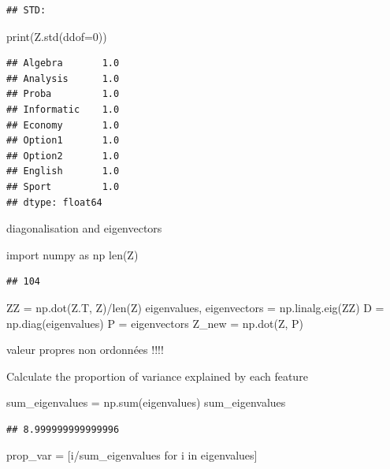 \documentclass[
  10pt,
]{article}
\newenvironment{Shaded}{\begin{snugshade}}{\end{snugshade}}
\newcommand{\NormalTok}[1]{#1}
\begin{document}
\begin{verbatim}
## STD:
\end{verbatim}

\begin{Shaded}
\begin{Highlighting}[]
\NormalTok{print(Z.std(ddof=0))}
\end{Highlighting}
\end{Shaded}

\begin{verbatim}
## Algebra       1.0
## Analysis      1.0
## Proba         1.0
## Informatic    1.0
## Economy       1.0
## Option1       1.0
## Option2       1.0
## English       1.0
## Sport         1.0
## dtype: float64
\end{verbatim}

diagonalisation and eigenvectors

\begin{Shaded}
\begin{Highlighting}[]
\NormalTok{import numpy as np}
\NormalTok{len(Z)}
\end{Highlighting}
\end{Shaded}

\begin{verbatim}
## 104
\end{verbatim}

\begin{Shaded}
\begin{Highlighting}[]
\NormalTok{ZZ = np.dot(Z.T, Z)/len(Z)}
\NormalTok{eigenvalues, eigenvectors = np.linalg.eig(ZZ)}
\NormalTok{D = np.diag(eigenvalues)}
\NormalTok{P = eigenvectors}
\NormalTok{Z\_new = np.dot(Z, P)}
\end{Highlighting}
\end{Shaded}

valeur propres non ordonnées !!!!

Calculate the proportion of variance explained by each feature

\begin{Shaded}
\begin{Highlighting}[]
\NormalTok{sum\_eigenvalues = np.sum(eigenvalues)}
\NormalTok{sum\_eigenvalues}
\end{Highlighting}
\end{Shaded}

\begin{verbatim}
## 8.999999999999996
\end{verbatim}

\begin{Shaded}
\begin{Highlighting}[]
\NormalTok{prop\_var = [i/sum\_eigenvalues for i in eigenvalues]}
\end{Highlighting}
\end{Shaded}
\end{document}
